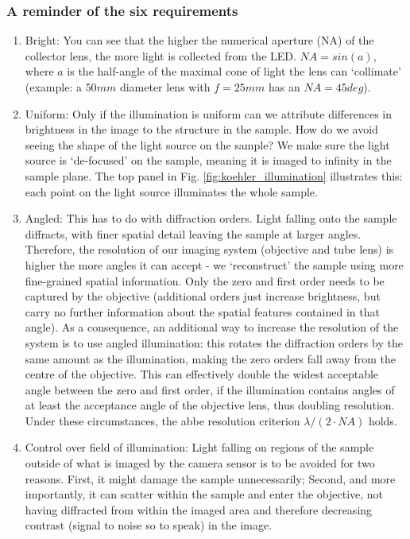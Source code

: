 \documentclass[a4paper]{report}
\begin{document}
	\subsubsection{A reminder of the six requirements}
	\begin{enumerate}
	    \item Bright: You can see that the higher the numerical aperture (NA) of the collector lens, the more light is collected from the LED. $NA=sin(a)$, where $a$ is the half-angle of the maximal cone of light the lens can `collimate' (example: a $50mm$ diameter lens with $f=25mm$ has an $NA=45deg$).
	    \item Uniform: Only if the illumination is uniform can we attribute differences in brightness in the image to the structure in the sample. How do we avoid seeing the shape of the light source on the sample? We make sure the light source is `de-focused' on the sample, meaning it is imaged to infinity in the sample plane. The top panel in Fig. \ref{fig:koehler_illumination} illustrates this: each point on the light source illuminates the whole sample.
	    \item Angled: This has to do with diffraction orders. Light falling onto the sample diffracts, with finer spatial detail leaving the sample at larger angles. Therefore, the resolution of our imaging system (objective and tube lens) is higher the more angles it can accept - we `reconstruct' the sample using more fine-grained spatial information. Only the zero and first order needs to be captured by the objective (additional orders just increase brightness, but carry no further information about the spatial features contained in that angle). As a consequence, an additional way to increase the resolution of the system is to use angled illumination: this rotates the diffraction orders by the same amount as the illumination, making the zero orders fall away from the centre of the objective. This can effectively double the widest acceptable angle between the zero and first order, if the illumination contains angles of at least the acceptance angle of the objective lens, thus doubling resolution. Under these circumstances, the abbe resolution criterion $\lambda / (2\cdot NA)$ holds.  
	    \item Control over field of illumination: Light falling on regions of the sample outside of what is imaged by the camera sensor is to be avoided for two reasons. First, it might damage the sample unnecessarily; Second, and more importantly, it can scatter within the sample and enter the objective, not having diffracted from within the imaged area and therefore decreasing contrast (signal to noise so to speak) in the image.

\end{enumerate}
\end{document}
